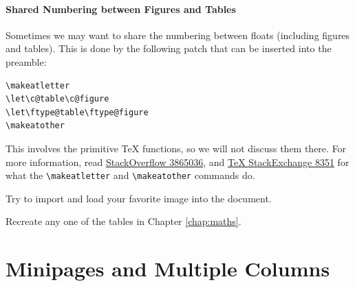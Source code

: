 \paragraph{Shared Numbering between Figures and Tables}
Sometimes we may want to share the numbering between floats (including figures and tables). This is done by the following patch that can be inserted into the preamble:
\begin{lstlisting}
\makeatletter
\let\c@table\c@figure
\let\ftype@table\ftype@figure
\makeatother
\end{lstlisting}
This involves the primitive \TeX{} functions, so we will not discuss them there. For more information, read \href{https://stackoverflow.com/questions/3865036/using-a-single-count-for-figures-and-tables-in-latex}{StackOverflow 3865036}, and \href{https://tex.stackexchange.com/questions/8351/what-do-makeatletter-and-makeatother-do}{\TeX{} StackExchange 8351} for what the \texttt{\textbackslash makeatletter} and \texttt{\textbackslash makeatother} commands do.

\begin{exercisebox}
\begin{Exercise}
Try to import and load your favorite image into the document. 
\end{Exercise}
\begin{Exercise}
Recreate any one of the tables in Chapter \ref{chap:maths}.
\end{Exercise}
\end{exercisebox}

\section{Minipages and Multiple Columns}

